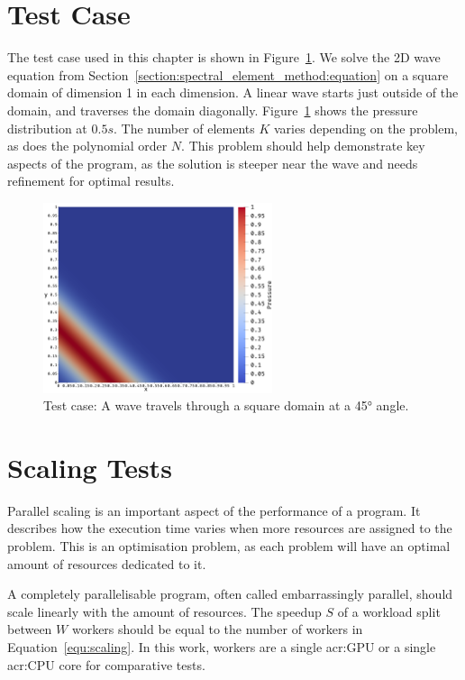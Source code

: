\section{Test Case}\label{section:results:test_case}

The test case used in this chapter is shown in Figure~\ref{fig:problem}. We solve the 2D wave
equation from Section~\ref{section:spectral_element_method:equation} on a square domain of dimension
1 in each dimension. A linear wave starts just outside of the domain, and traverses the domain
diagonally. Figure~\ref{fig:problem} shows the pressure distribution at \(0.5 s\). The number of
elements \( K \) varies depending on the problem, as does the polynomial order \( N \). This problem
should help demonstrate key aspects of the program, as the solution is steeper near the wave and
needs refinement for optimal results.

\begin{figure}[H]
	\centering
	\includegraphics[width=0.6\textwidth]{Chapter_results/media/problem_1}
	\caption{Test case: A wave travels through a square domain at a 45° angle.}\label{fig:problem}
\end{figure}

\section{Scaling Tests}\label{section:results:scaling_tests}

Parallel scaling is an important aspect of the performance of a program. It describes how the
execution time varies when more resources are assigned to the problem. This is an optimisation
problem, as each problem will have an optimal amount of resources dedicated to it. 

A completely parallelisable program, often called embarrassingly parallel, should scale linearly
with the amount of resources. The speedup \(S\) of a workload split between \(W\) workers should be
equal to the number of workers in Equation~\ref{equ:scaling}. In this work, workers are a single
\acrshort{acr:GPU} or a single \acrshort{acr:CPU} core for comparative tests.

